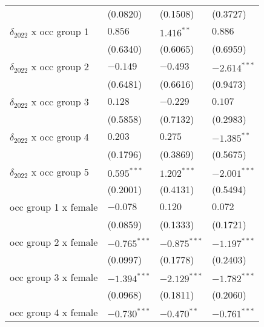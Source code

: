 \begin{tabular}{llll}
                                       &           (0.0820) &           (0.1508) &           (0.3727) \\
$\delta_{2022}$ x occ group 1          &            $0.856$ &       $1.416^{**}$ &            $0.886$ \\
                                       &           (0.6340) &           (0.6065) &           (0.6959) \\
$\delta_{2022}$ x occ group 2          &           $-0.149$ &           $-0.493$ &     $-2.614^{***}$ \\
                                       &           (0.6481) &           (0.6616) &           (0.9473) \\
$\delta_{2022}$ x occ group 3          &            $0.128$ &           $-0.229$ &            $0.107$ \\
                                       &           (0.5858) &           (0.7132) &           (0.2983) \\
$\delta_{2022}$ x occ group 4          &            $0.203$ &            $0.275$ &      $-1.385^{**}$ \\
                                       &           (0.1796) &           (0.3869) &           (0.5675) \\
$\delta_{2022}$ x occ group 5          &      $0.595^{***}$ &      $1.202^{***}$ &     $-2.001^{***}$ \\
                                       &           (0.2001) &           (0.4131) &           (0.5494) \\
occ group 1 x female                   &           $-0.078$ &            $0.120$ &            $0.072$ \\
                                       &           (0.0859) &           (0.1333) &           (0.1721) \\
occ group 2 x female                   &     $-0.765^{***}$ &     $-0.875^{***}$ &     $-1.197^{***}$ \\
                                       &           (0.0997) &           (0.1778) &           (0.2403) \\
occ group 3 x female                   &     $-1.394^{***}$ &     $-2.129^{***}$ &     $-1.782^{***}$ \\
                                       &           (0.0968) &           (0.1811) &           (0.2060) \\
occ group 4 x female                   &     $-0.730^{***}$ &      $-0.470^{**}$ &     $-0.761^{***}$ \\

\end{tabular}
